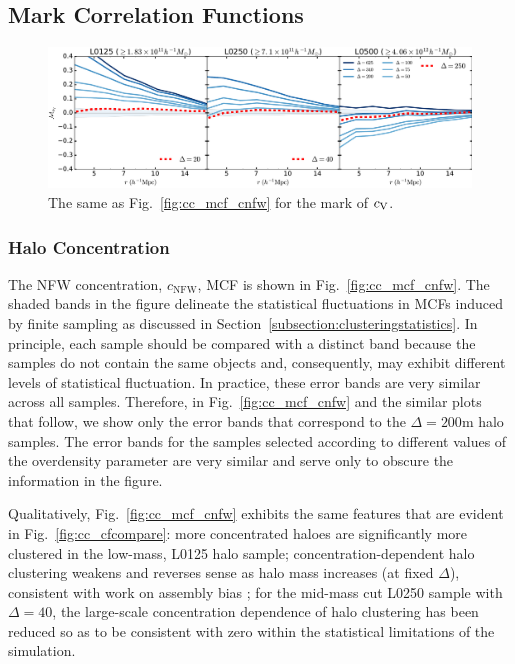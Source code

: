 \documentclass[usenatbib,fleqn]{mnras}
\begin{document}
\subsection{Mark Correlation Functions}
\label{sub:mcfresults}


\begin{figure}
	\centering
	\includegraphics[width=\textwidth]{all_mcf_cV.pdf}
	\caption{	
The same as Fig.~\ref{fig:cc_mcf_cnfw} for the mark of $c_{\rm V}$.
}
	\label{fig:cc_mcf_cV}
\end{figure}

\subsubsection{Halo Concentration}

The NFW concentration, $c_{\mathrm{NFW}}$, MCF is shown in Fig.~\ref{fig:cc_mcf_cnfw}. The shaded bands in the figure delineate the statistical fluctuations in MCFs induced by finite sampling as discussed in Section~\ref{subsection:clusteringstatistics}. In principle, each sample should be compared with a distinct band because the samples do not contain the same objects and, consequently, may exhibit different levels of statistical fluctuation. In practice, these error bands are very similar across all samples. Therefore, in Fig.~\ref{fig:cc_mcf_cnfw} and the similar plots that follow, we show only the error bands that correspond to the $\Delta=200$m halo samples. The error bands for the samples selected according to different values of the overdensity parameter are very similar and serve only to obscure the information in the figure. 

Qualitatively, Fig.~\ref{fig:cc_mcf_cnfw} exhibits the same features that are evident in Fig.~\ref{fig:cc_cfcompare}: more concentrated haloes are significantly more clustered in the low-mass, L0125 halo sample; concentration-dependent halo clustering weakens and reverses sense as halo mass increases (at fixed $\Delta$), consistent with work on assembly bias \citep{wechsler_etal06,sunayama_etal16}; for the mid-mass cut L0250 sample with $\Delta=40$, the large-scale concentration dependence of halo clustering has been reduced so as to be consistent with zero within the statistical limitations of the simulation. 
\end{document}
